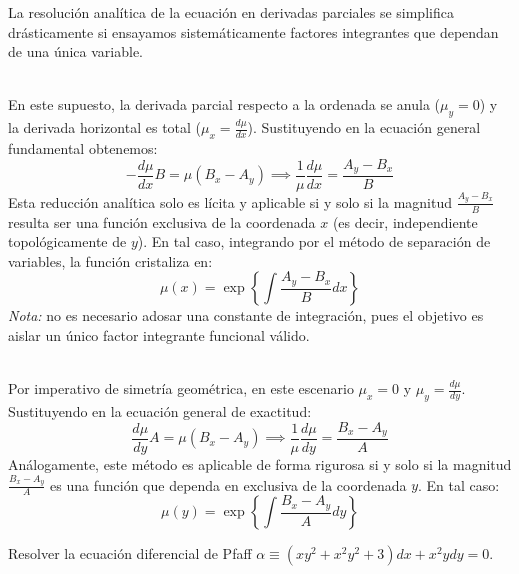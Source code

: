 \begin{tcolorbox}[recuadro={Casos particulares notables: deducción de factores unidimensionales}]
La resolución analítica de la ecuación en derivadas parciales se simplifica drásticamente si ensayamos sistemáticamente factores integrantes que dependan de una única variable.

\begin{description}[leftmargin=*, labelsep=1em, itemsep=12pt]
    \item[\textcolor{acc}{1. Factor integrante dependiente solo de $\boldsymbol{x}$ ($\mu = \mu(x)$):}] \hfill \\
    En este supuesto, la derivada parcial respecto a la ordenada se anula ($\mu_y = 0$) y la derivada horizontal es total ($\mu_x = \frac{d\mu}{dx}$). Sustituyendo en la ecuación general fundamental obtenemos:
    $$ -\frac{d\mu}{dx}B = \mu(B_x - A_y) \implies \frac{1}{\mu}\frac{d\mu}{dx} = \frac{A_y - B_x}{B} $$
    Esta reducción analítica solo es lícita y aplicable si y solo si la magnitud $\frac{A_y - B_x}{B}$ resulta ser una función exclusiva de la coordenada $x$ (es decir, independiente topológicamente de $y$). En tal caso, integrando por el método de separación de variables, la función cristaliza en:
    $$ \mu(x) = \exp\left\{ \int \frac{A_y - B_x}{B} dx \right\} $$
    \textit{Nota:} no es necesario adosar una constante de integración, pues el objetivo es aislar un único factor integrante funcional válido.
    
    \item[\textcolor{acc}{2. Factor integrante dependiente solo de $\boldsymbol{y}$ ($\mu = \mu(y)$):}] \hfill \\
    Por imperativo de simetría geométrica, en este escenario $\mu_x = 0$ y $\mu_y = \frac{d\mu}{dy}$. Sustituyendo en la ecuación general de exactitud:
    $$ \frac{d\mu}{dy}A = \mu(B_x - A_y) \implies \frac{1}{\mu}\frac{d\mu}{dy} = \frac{B_x - A_y}{A} $$
    Análogamente, este método es aplicable de forma rigurosa si y solo si la magnitud $\frac{B_x - A_y}{A}$ es una función que dependa en exclusiva de la coordenada $y$. En tal caso:
    $$ \mu(y) = \exp\left\{ \int \frac{B_x - A_y}{A} dy \right\} $$
\end{description}
\end{tcolorbox}

\begin{ejercicio}
Resolver la ecuación diferencial de Pfaff $\alpha \equiv (xy^2 + x^2y^2 + 3)dx + x^2y dy = 0$.
\end{ejercicio}

